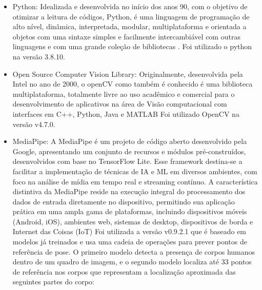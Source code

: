 \begin{itemize}




   \item Python: Idealizada e desenvolvida no início dos anos 90,  com o objetivo de otimizar a leitura de códigos, Python, é uma linguagem de programação de alto nível, dinâmica, interpretada, modular, multiplataforma e orientada a objetos com uma sintaxe simples e facilmente intercambiável com outras linguagens e com uma grande coleção de bibliotecas \cite{python}. Foi utilizado o python na versão 3.8.10.

   \item Open Source Computer Vision Library: Originalmente, desenvolvida pela Intel no ano de 2000, o openCV como também é conhecido é uma biblioteca multiplataforma, totalmente livre ao uso acadêmico e comercial para o desenvolvimento de aplicativos na área de Visão computacional com interfaces em C++, Python, Java e MATLAB \cite{openCV} Foi utilizado OpenCV na versão v4.7.0.
   
   \item MediaPipe: A MediaPipe é um projeto de código aberto desenvolvido pela Google, apresentando um conjunto de recursos e módulos pré-construídos, desenvolvidos com base no TensorFlow Lite. Esse framework destina-se a facilitar a implementação de técnicas de \ac{IA} e \ac{ML} em diversos ambientes, com foco na análise de mídia em tempo real e streaming contínuo. A característica distintiva da MediaPipe reside na execução integral do processamento dos dados de entrada diretamente no dispositivo, permitindo sua aplicação prática em uma ampla gama de plataformas, incluindo dispositivos móveis (Android, iOS), ambientes web, sistemas de desktop, dispositivos de borda e Internet das Coisas (IoT)\cite{mediapipe} Foi utilizada a versão v0.9.2.1 que é baseado em modelos já treinados e usa uma cadeia de operações para prever pontos de referência de pose. O primeiro modelo detecta a presença de corpos humanos dentro de um quadro de imagem, e o segundo modelo localiza até 33 pontos de referência nos corpos \cite{mediapipe_pose_landmarker} que representam a localização aproximada das seguintes partes do corpo:



\end{itemize}
